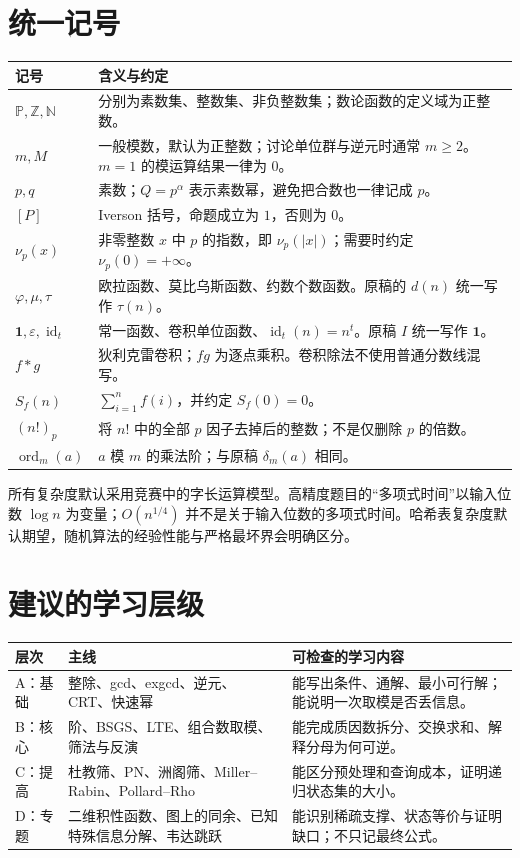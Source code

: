 \documentclass[UTF8,a4paper,11pt,oneside,openany,fontset=fandol]{ctexbook}
\theoremstyle{definition}
\newcommand{\Z}{\mathbb Z}
\newcommand{\N}{\mathbb N}
\newcommand{\Pp}{\mathbb P}
\newcommand{\eps}{\varepsilon}
\newcommand{\one}{\mathbf 1}
\newcommand{\id}{\operatorname{id}}
\newcommand{\ord}{\operatorname{ord}}
\newcommand{\iva}[1]{\left[#1\right]}
\begin{document}
\section*{统一记号}
\begin{longtable}{p{}p{}}
\toprule
记号 & 含义与约定\\\midrule
$\Pp,\Z,\N$ & 分别为素数集、整数集、非负整数集；数论函数的定义域为正整数。\\
$m,M$ & 一般模数，默认为正整数；讨论单位群与逆元时通常 $m\ge2$。$m=1$ 的模运算结果一律为 $0$。\\
$p,q$ & 素数；$Q=p^\alpha$ 表示素数幂，避免把合数也一律记成 $p$。\\
$\iva{P}$ & Iverson 括号，命题成立为 $1$，否则为 $0$。\\
$\nu_p(x)$ & 非零整数 $x$ 中 $p$ 的指数，即 $\nu_p(|x|)$；需要时约定 $\nu_p(0)=+\infty$。\\
$\varphi,\mu,\tau$ & 欧拉函数、莫比乌斯函数、约数个数函数。原稿的 $d(n)$ 统一写作 $\tau(n)$。\\
$\one,\eps,\id_t$ & 常一函数、卷积单位函数、$\id_t(n)=n^t$。原稿 $I$ 统一写作 $\one$。\\
$f*g$ & 狄利克雷卷积；$fg$ 为逐点乘积。卷积除法不使用普通分数线混写。\\
$S_f(n)$ & $\sum_{i=1}^n f(i)$，并约定 $S_f(0)=0$。\\
$(n!)_p$ & 将 $n!$ 中的全部 $p$ 因子去掉后的整数；不是仅删除 $p$ 的倍数。\\
$\ord_m(a)$ & $a$ 模 $m$ 的乘法阶；与原稿 $\delta_m(a)$ 相同。\\
\bottomrule
\end{longtable}

所有复杂度默认采用竞赛中的字长运算模型。高精度题目的“多项式时间”以输入位数 $\log n$ 为变量；$O(n^{1/4})$ 并不是关于输入位数的多项式时间。哈希表复杂度默认期望，随机算法的经验性能与严格最坏界会明确区分。

\section*{建议的学习层级}
\begin{longtable}{p{}p{}p{}}
\toprule
层次 & 主线 & 可检查的学习内容\\\midrule
A：基础 & 整除、gcd、exgcd、逆元、CRT、快速幂 & 能写出条件、通解、最小可行解；能说明一次取模是否丢信息。\\
B：核心 & 阶、BSGS、LTE、组合数取模、筛法与反演 & 能完成质因数拆分、交换求和、解释分母为何可逆。\\
C：提高 & 杜教筛、PN、洲阁筛、Miller--Rabin、Pollard--Rho & 能区分预处理和查询成本，证明递归状态集的大小。\\
D：专题 & 二维积性函数、图上的同余、已知特殊信息分解、韦达跳跃 & 能识别稀疏支撑、状态等价与证明缺口；不只记最终公式。\\
\bottomrule
\end{longtable}
\end{document}
